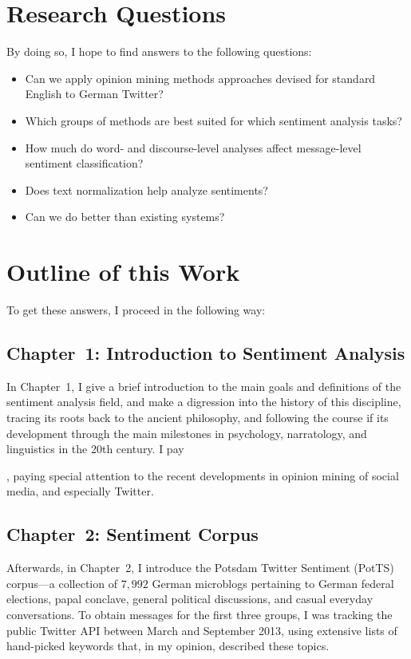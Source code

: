 \documentclass[11pt]{article}
\begin{document}
\section{Research Questions}

By doing so, I hope to find answers to the following questions:
\begin{itemize}
\item Can we apply opinion mining methods approaches devised for
  standard English to German Twitter?
\item Which groups of methods are best suited for which sentiment
  analysis tasks?
\item How much do word- and discourse-level analyses affect
  message-level sentiment classification?
\item Does text normalization help analyze sentiments?
\item Can we do better than existing systems?
\end{itemize}

\section{Outline of this Work}

To get these answers, I proceed in the following way:

\subsection{Chapter~1: Introduction to Sentiment Analysis}

In Chapter~1, I give a brief introduction to the main goals and
definitions of the sentiment analysis field, and make a digression
into the history of this discipline, tracing its roots back to the
ancient philosophy, and following the course if its development
through the main milestones in psychology, narratology, and
linguistics in the 20th century.  I pay

, paying special attention to the recent
developments in opinion mining of social media, and especially
Twitter.

\subsection{Chapter~2: Sentiment Corpus}

Afterwards, in Chapter~2, I introduce the Potsdam Twitter Sentiment
(PotTS) corpus---a collection of $7,992$ German microblogs pertaining
to German federal elections, papal conclave, general political
discussions, and casual everyday conversations.  To obtain messages
for the first three groups, I was tracking the public Twitter API
between March and September 2013, using extensive lists of hand-picked
keywords that, in my opinion, described these topics.
\end{document}
